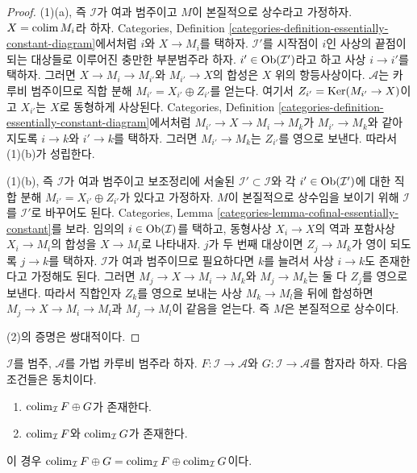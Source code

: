 \begin{proof}
(1)(a), 즉 $\mathcal{I}$가 여과 범주이고 $M$이 본질적으로 상수라고
가정하자. $X = \mathop{\mathrm{colim}}\nolimits M_i$라 하자. Categories, Definition
\ref{categories-definition-essentially-constant-diagram}에서처럼
$i$와 $X \to M_i$를 택하자. $\mathcal{I}'$를 시작점이 $i$인 사상의
끝점이 되는 대상들로 이루어진 충만한 부분범주라 하자.
$i' \in \mathop{\mathrm{Ob}}\nolimits(\mathcal{I}')$라고 하고 사상 $i \to i'$를 택하자.
그러면 $X \to M_i \to M_{i'}$와 $M_{i'} \to X$의 합성은 $X$ 위의
항등사상이다. $\mathcal{A}$는 카루비 범주이므로 직합 분해
$M_{i'} = X_{i'} \oplus Z_{i'}$를 얻는다. 여기서
$Z_{i'} = \mathop{\mathrm{Ker}}(M_{i'} \to X)$이고 $X_{i'}$는 $X$로 동형하게 사상된다.
Categories, Definition
\ref{categories-definition-essentially-constant-diagram}에서처럼
$M_{i'} \to X \to M_i \to M_k$가 $M_{i'} \to M_k$와 같아지도록
$i \to k$와 $i' \to k$를 택하자. 그러면 $M_{i'} \to M_k$는
$Z_{i'}$를 영으로 보낸다. 따라서 (1)(b)가 성립한다.

\medskip\noindent
(1)(b), 즉 $\mathcal{I}$가 여과 범주이고 보조정리에 서술된
$\mathcal{I}' \subset \mathcal{I}$와 각 $i' \in \mathop{\mathrm{Ob}}\nolimits(\mathcal{I}')$에
대한 직합 분해 $M_{i'} = X_{i'} \oplus Z_{i'}$가 있다고 가정하자.
$M$이 본질적으로 상수임을 보이기 위해 $\mathcal{I}$를
$\mathcal{I}'$로 바꾸어도 된다. Categories, Lemma
\ref{categories-lemma-cofinal-essentially-constant}를 보라.
임의의 $i \in \mathop{\mathrm{Ob}}\nolimits(\mathcal{I})$를 택하고, 동형사상 $X_i \to X$의
역과 포함사상 $X_i \to M_i$의 합성을 $X \to M_i$로 나타내자.
$j$가 두 번째 대상이면 $Z_j \to M_k$가 영이 되도록 $j \to k$를
택하자. $\mathcal{I}$가 여과 범주이므로 필요하다면 $k$를 늘려서
사상 $i \to k$도 존재한다고 가정해도 된다. 그러면
$M_j \to X \to M_i \to M_k$와 $M_j \to M_k$는 둘 다 $Z_j$를
영으로 보낸다. 따라서 직합인자 $Z_k$를 영으로 보내는 사상
$M_k \to M_l$을 뒤에 합성하면 $M_j \to X \to M_i \to M_l$과
$M_j \to M_l$이 같음을 얻는다. 즉 $M$은 본질적으로 상수이다.

\medskip\noindent
(2)의 증명은 쌍대적이다.
\end{proof}

\begin{lemma}
\label{lemma-direct-sum-from-product-colimit}
$\mathcal{I}$를 범주, $\mathcal{A}$를 가법 카루비 범주라 하자.
$F : \mathcal{I} \to \mathcal{A}$와
$G : \mathcal{I} \to \mathcal{A}$를 함자라 하자. 다음 조건들은 동치이다.
\begin{enumerate}
\item $\mathop{\mathrm{colim}}\nolimits_\mathcal{I} F \oplus G$가 존재한다.
\item $\mathop{\mathrm{colim}}\nolimits_\mathcal{I} F$와 $\mathop{\mathrm{colim}}\nolimits_\mathcal{I} G$가 존재한다.
\end{enumerate}
이 경우
$\mathop{\mathrm{colim}}\nolimits_\mathcal{I} F \oplus G =
\mathop{\mathrm{colim}}\nolimits_\mathcal{I} F \oplus \mathop{\mathrm{colim}}\nolimits_\mathcal{I} G$이다.
\end{lemma}

